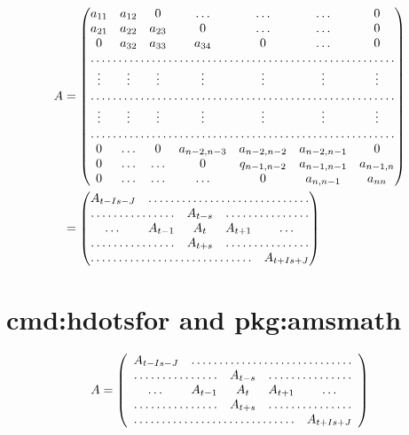 \documentclass[11pt]{revtex4-1}
\begin{document}
\begin{align}
  A &= \begin{pmatrix}
    a_{11} & a_{12} & 0 & \ldots & \ldots & \ldots & 0 \\
    a_{21} & a_{22} & a_{23} & 0 & \ldots & \ldots & 0 \\
    0 & a_{32} & a_{33} & a_{34} & 0 & \ldots & 0 \\
    \hdotsfor{7} \\
    \vdots & \vdots & \vdots & \vdots & \vdots & \vdots & \vdots \\
    \hdotsfor{7} \\
      \vdots & \vdots & \vdots & \vdots & \vdots & \vdots & \vdots \\
    \hdotsfor{7} \\
    0 & \ldots & 0 & a_{n-2,n-3} & a_{n-2,n-2} & a_{n-2,n-1} & 0 \\
    0 & \ldots & \ldots & 0 & q_{n-1,n-2} & a_{n-1,n-1} & a_{n-1,n} \\
    0 & \ldots & \ldots & \ldots & 0 & a_{n,n-1} & a_{nn}
  \end{pmatrix} \\
  &= \begin{pmatrix}
    A_{t-I s-J} & \hdotsfor{4} \\
    \hdotsfor{2} & A_{t-s} & \hdotsfor{2} \\
    \dots & A_{t-1} & A_t & A_{t+1} & \dots \\
    \hdotsfor{2} & A_{t+s} & \hdotsfor{2} \\
    \hdotsfor{4} & A_{t+I s+J}
  \end{pmatrix}
\end{align}

\section{cmd:hdotsfor and pkg:amsmath}


\begin{equation}
  A = \left(\begin{array}{ccccccc}
    A_{t-I s-J} & \hdotsfor{4} \\
    \hdotsfor{2} & A_{t-s} & \hdotsfor{2} \\
    \dots & A_{t-1} & A_t & A_{t+1} & \dots \\
    \hdotsfor{2} & A_{t+s} & \hdotsfor{2} \\
    \hdotsfor{4} & A_{t+I s+J}
  \end{array}\right)
\end{equation}
\end{document}
